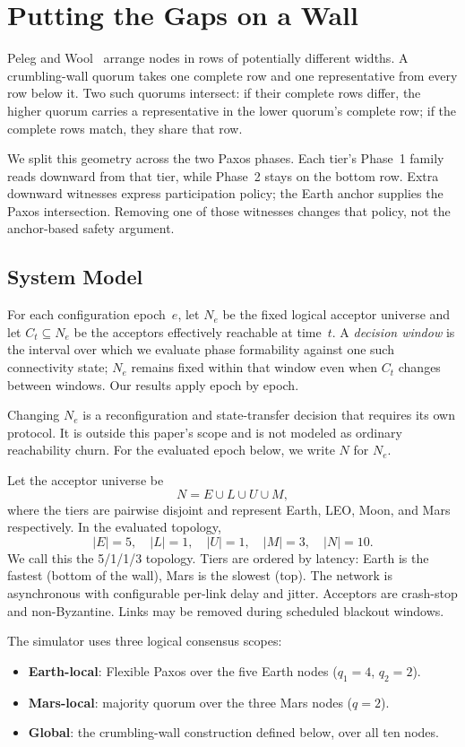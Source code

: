 \documentclass[letterpaper,twocolumn,10pt]{article}
\begin{document}
\section{Putting the Gaps on a Wall}
\label{sec:construction}

Peleg and Wool~\cite{peleg1995} arrange nodes in rows of potentially different widths. A crumbling-wall quorum takes one complete row and one representative from every row below it. Two such quorums intersect: if their complete rows differ, the higher quorum carries a representative in the lower quorum's complete row; if the complete rows match, they share that row.

We split this geometry across the two Paxos phases. Each tier's Phase~1 family reads downward from that tier, while Phase~2 stays on the bottom row. Extra downward witnesses express participation policy; the Earth anchor supplies the Paxos intersection. Removing one of those witnesses changes that policy, not the anchor-based safety argument.

\subsection{System Model}
For each configuration epoch~$e$, let $N_e$ be the fixed logical acceptor universe and let $C_t \subseteq N_e$ be the acceptors effectively reachable at time~$t$. A \emph{decision window} is the interval over which we evaluate phase formability against one such connectivity state; $N_e$ remains fixed within that window even when $C_t$ changes between windows. Our results apply epoch by epoch.

Changing $N_e$ is a reconfiguration and state-transfer decision that requires its own protocol. It is outside this paper's scope and is not modeled as ordinary reachability churn. For the evaluated epoch below, we write $N$ for $N_e$.

Let the acceptor universe be
\[
N = E \cup L \cup U \cup M,
\]
where the tiers are pairwise disjoint and represent Earth, LEO, Moon, and Mars respectively. In the evaluated topology,
\[
|E| = 5,\quad |L| = 1,\quad |U| = 1,\quad |M| = 3,\quad |N| = 10.
\]
We call this the 5/1/1/3 topology. Tiers are ordered by latency: Earth is the fastest (bottom of the wall), Mars is the slowest (top). The network is asynchronous with configurable per-link delay and jitter. Acceptors are crash-stop and non-Byzantine. Links may be removed during scheduled blackout windows.

The simulator uses three logical consensus scopes:
\begin{itemize}
\item \textbf{Earth-local}: Flexible Paxos over the five Earth nodes ($q_1 = 4$, $q_2 = 2$).
\item \textbf{Mars-local}: majority quorum over the three Mars nodes ($q = 2$).
\item \textbf{Global}: the crumbling-wall construction defined below, over all ten nodes.
\end{itemize}
\end{document}
